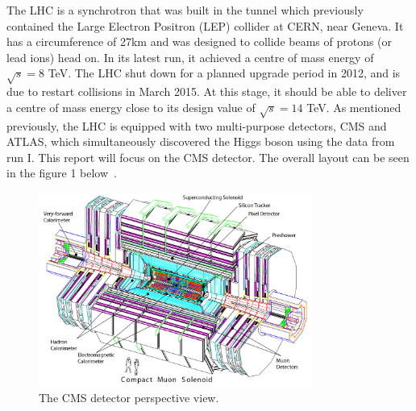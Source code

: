 \documentclass[10pt]{article}
\begin{document}
The LHC is a synchrotron that was built in the tunnel which previously contained the Large Electron Positron (LEP) collider at CERN, near Geneva. It has a circumference of 27km and was designed to collide beams of protons (or lead ions) head on. In its latest run, it achieved a centre of mass energy of $\sqrt{s}=8$ TeV. The LHC shut down for a planned upgrade period in 2012, and is due to restart collisions in March 2015. At this stage, it should be able to deliver a centre of mass energy close to its design value of $\sqrt{s}=14$ TeV. 
As mentioned previously, the LHC is equipped with two multi-purpose detectors, CMS and ATLAS, which simultaneously discovered the Higgs boson using the data from run I. This report will focus on the CMS detector. The overall layout can be seen in the figure 1 below~\cite{CMSTDR}.
\begin{figure}[h]

  \centering
  \includegraphics[width=0.8\textwidth]{"CMSExploded"}
  \caption{The CMS detector perspective view.}
\end{figure}
\end{document}
